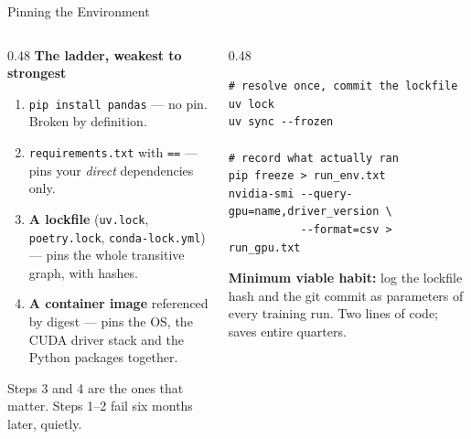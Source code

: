 
\begin{frame}[fragile]{Pinning the Environment}

    \begin{columns}[T]
        \begin{column}{0.48\textwidth}
            \small
            \textbf{The ladder, weakest to strongest}
            \begin{enumerate}
                \item \texttt{pip install pandas} --- no pin. Broken by definition.
                \item \texttt{requirements.txt} with \texttt{==} --- pins your \emph{direct} dependencies only.
                \item \textbf{A lockfile} (\texttt{uv.lock}, \texttt{poetry.lock}, \texttt{conda-lock.yml})
                      --- pins the whole transitive graph, with hashes.
                \item \textbf{A container image} referenced by digest --- pins the OS, the CUDA driver stack
                      and the Python packages together.
            \end{enumerate}
            \vspace{0.4em}
            Steps 3 and 4 are the ones that matter. Steps 1--2 fail six months later, quietly.
        \end{column}
        \begin{column}{0.48\textwidth}
            \begin{lstlisting}[basicstyle=\ttfamily\scriptsize]
# resolve once, commit the lockfile
uv lock
uv sync --frozen

# record what actually ran
pip freeze > run_env.txt
nvidia-smi --query-gpu=name,driver_version \
           --format=csv > run_gpu.txt
            \end{lstlisting}
            \vspace{0.2em}
            \begin{tcolorbox}[colback=blue!5, colframe=blue!40, boxrule=0.5pt]
                \scriptsize \textbf{Minimum viable habit:} log the lockfile hash and the git commit as
                parameters of every training run. Two lines of code; saves entire quarters.
            \end{tcolorbox}
        \end{column}
    \end{columns}

\end{frame}
